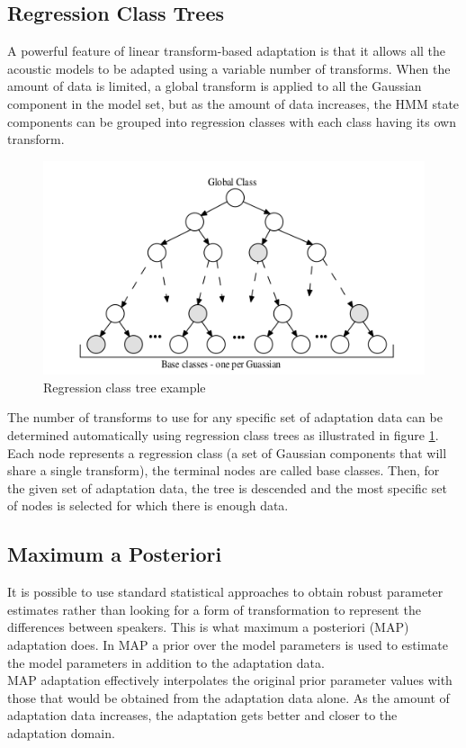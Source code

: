 \subsection{Regression Class Trees}\label{rcs}
A powerful feature of linear transform-based adaptation is that it allows all the acoustic models to be adapted using a variable number of transforms. When the amount of data is limited, a global transform is applied to all the  Gaussian component in the model set, but as the amount of data increases, the HMM state components can be grouped into regression classes with each class having its own transform.\\
\begin{figure}[htb]
	\begin{center}
	\includegraphics[width=1\textwidth]{img/RC2.png}
	\end{center}
	\caption{\label{rcimg}Regression class tree example \cite{hmmasr}}
\end{figure}
The number of transforms to use for any specific set of adaptation data can be determined automatically using regression class trees as illustrated in figure \ref{rcimg}. Each node represents a regression class (a set of Gaussian components that will share a single transform), the terminal nodes are called base classes. Then, for the given set of adaptation data, the tree is descended and the most specific set of nodes is selected for which there is enough data.
\subsection{Maximum a Posteriori}\label{map}
It is possible to use standard statistical approaches to obtain robust parameter estimates rather than looking for a form of transformation to represent the differences between speakers. This is what maximum a posteriori (MAP) adaptation does. In MAP a prior over the model parameters is used to estimate the model parameters in addition to the adaptation data.\\
MAP adaptation effectively interpolates the original prior parameter values with those that would be obtained from the adaptation data alone. As the amount of adaptation data increases, the adaptation gets better and closer to the adaptation domain.
